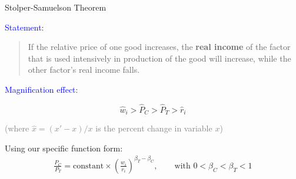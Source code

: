 \documentclass[notes,11pt, aspectratio=169, xcolor=table]{beamer}
\newcommand{\blue}[1]{\textcolor{blue}{#1}}
\newenvironment{wideitemize}{\itemize\addtolength{\itemsep}{10pt}}{\enditemize}
\begin{document}
\begin{frame}{Stolper-Samuelson Theorem}

        \begin{wideitemize}
            \item \blue{Statement}:

            \begin{quote}
                If the relative price of one good increases, the \textbf{real income} of the factor that is used intensively in production of the good will increase, while the other factor’s real income falls.
            \end{quote}

            \item<2-> \blue{Magnification effect}:

            \begin{equation*}
            \hat{w}_i > \hat{P}_C > \hat{P}_T > \hat{r}_i 
         \end{equation*}

         \textcolor{gray}{(where $\hat{x} = (x'-x)/x$ is the percent change in variable $x$)}

         \item<3-> Using our specific function form:
    \begin{eqnarray*}\label{eq: goods-factor-prices}
         \frac{P_C}{P_T} = \text{constant} \times \left(  \frac{w_i}{r_i} \right)^{\beta_T - \beta_C}, \qquad \text{with } 0<\beta_C<\beta_T<1
    \end{eqnarray*}         
    
\end{wideitemize}
\end{frame}
\end{document}
